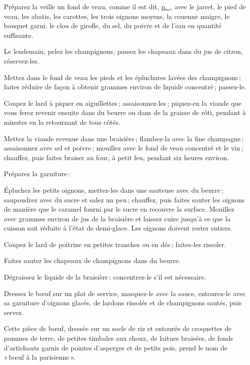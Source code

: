 Préparez la veille un fond de veau, comme il est dit,
\hyperlink{p0426}{p. \pageref{pg0426}}, avec le jarret, le pied de veau, les
abatis, les carottes, les trois oignons moyens, la couenne maigre, le bouquet
garni. le clou de girofle, du sel, du poivre et de l'eau en quantité
suffisante.

Le lendemain, pelez les champignons, passez les chapeaux dans du jus de citron,
réservez-les.

Mettez dans le fond de veau les pieds et les épluchures lavées des
champignons ; faites réduire de façon à obtenir {\mmm} grammes environ de liquide
concentré ; passez-le.

Coupez le lard à piquer en aiguillettes ; assaisonnez-les ; piquez-en la viande
que vous ferez revenir ensuite dans du beurre ou dans de la graisse de rôti,
pendant {\mmm} à {\mmm} minutes en la retournant de tous côtés.

Mettez la viande revenue dans une braisière ; flambez-la avec la fine
champagne ; assaisonnez avec sel et poivre ; mouillez avec le fond de veau
concentré et le vin ; chauffez, puis faites braiser au four, à petit feu,
pendant six heures environ.

Préparez la garniture :

Épluchez les petits oignons, mettez-les dans une sauteuse avec du beurre ;
saupoudrez avec du sucre et salez un peu ; chauffez, puis faites sauter les
oignons de manière que le caramel fourni par le sucre en recouvre la surface.
Mouillez avec {\mmm} grammes environ de jus de la braisière et laissez cuire
jusqu'à ce que la cuisson soit réduite à l'état de demi-glace. Les oignons
doivent rester entiers.

Coupez le lard de poitrine en petites tranches ou en dés ; faites-les rissoler.

Faites sauter les chapeaux de champignons dans du beurre.

Dégraissez le liquide de la braisière ; concentrez-le s'il est nécessaire.

Dressez le bœuf sur un plat de service, masquez-le avec la sauce, entourez-le
avec sa garniture d'oignons glacés, de lardons rissolés et de champignons
sautés, puis servez.

\sk

Cette pièce de bœuf, dressée sur un socle de riz et entourée de croquettes de
pommes de terre, de petites timbales aux choux, de laitues braisées, de fonds
d'artichauts garnis de pointes d'asperges et de petits pois, prend le nom de
« bœuf à la parisienne ».

